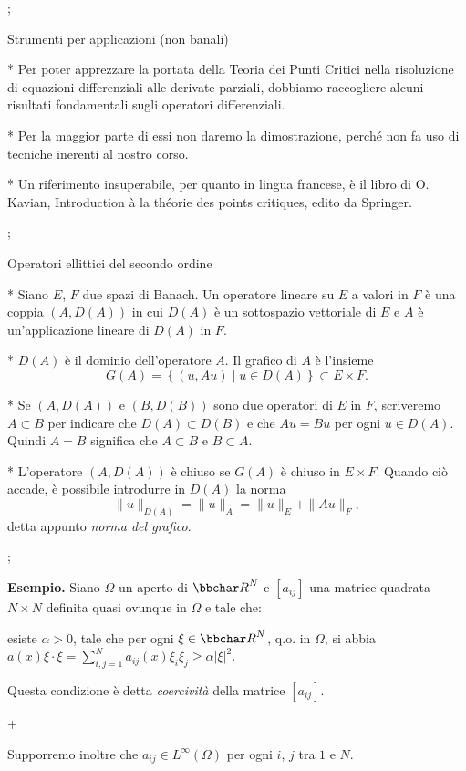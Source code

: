 \pg;

\sec Strumenti per applicazioni (non banali)

* Per poter apprezzare la portata della Teoria dei Punti Critici nella
  risoluzione di equazioni differenziali alle derivate parziali,
  dobbiamo raccogliere alcuni risultati fondamentali sugli operatori
  differenziali.

* Per la maggior parte di essi non daremo la dimostrazione, perch\'e
  non fa uso di tecniche inerenti al nostro corso.

* Un riferimento insuperabile, per quanto in lingua francese, \`e il
  libro di O. Kavian, Introduction \`a la th\'eorie des points
  critiques, edito da Springer.

\pg;

\sec Operatori ellittici del secondo ordine

* Siano $E$, $F$ due spazi di Banach. Un operatore lineare su $E$ a
valori in $F$ \`e una coppia $(A,D(A))$ in cui $D(A)$ \`e un
sottospazio vettoriale di $E$ e $A$ \`e un'applicazione lineare di
$D(A)$ in $F$.

* $D(A)$ \`e il dominio dell'operatore $A$. Il grafico di $A$ \`e
  l'insieme
  $$
  G(A) = \left\{ (u,Au) \mid u \in D(A) \right\} \subset E \times F.
  $$

* Se $(A,D(A))$ e $(B,D(B))$ sono due operatori di $E$ in $F$,
  scriveremo $A \subset B$ per indicare che $D(A) \subset D(B)$ e che
  $Au=Bu$ per ogni $u \in D(A)$. Quindi $A=B$ significa che $A \subset
  B$ e $B \subset A$.

* L'operatore $(A,D(A))$ \`e chiuso se $G(A)$ \`e chiuso in $E \times
  F$. Quando ci\`o accade, \`e possibile introdurre in $D(A)$ la norma
  $$
  \|u\|_{D(A)} = \|u\|_A = \|u\|_E + \|Au\|_F,
  $$
  detta appunto {\em norma del grafico}.

\pg;

{\bf Esempio.} Siano $\Omega$ un aperto di $\R^N$ e $[a_{ij}]$ una
matrice quadrata $N \times N$ definita quasi ovunque in $\Omega$ e
tale che:

esiste $\alpha>0$, tale che per ogni $\xi \in \R^N$, q.o. in $\Omega$,
si abbia $a(x) \xi \cdot \xi = \sum_{i,j=1}^N a_{ij}(x) \xi_i \xi_j
\geq \alpha |\xi|^2$.

Questa condizione \`e detta {\em coercivit\`a} della matrice
$[a_{ij}]$.

\pg+

Supporremo inoltre che $a_{ij} \in L^\infty(\Omega)$ per ogni $i$, $j$
tra $1$ e $N$.

